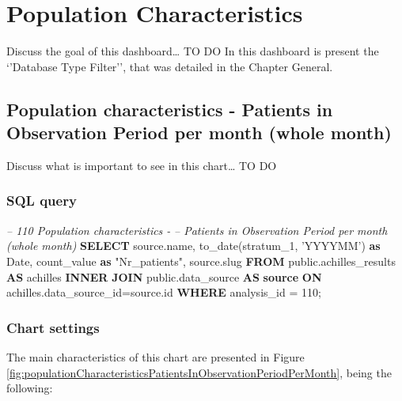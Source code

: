 \documentclass[]{book}
\newenvironment{Shaded}{\begin{snugshade}}{\end{snugshade}}
\newcommand{\KeywordTok}[1]{\textcolor[rgb]{0.13,0.29,0.53}{\textbf{#1}}}
\newcommand{\DataTypeTok}[1]{\textcolor[rgb]{0.13,0.29,0.53}{#1}}
\newcommand{\DecValTok}[1]{\textcolor[rgb]{0.00,0.00,0.81}{#1}}
\newcommand{\StringTok}[1]{\textcolor[rgb]{0.31,0.60,0.02}{#1}}
\newcommand{\CommentTok}[1]{\textcolor[rgb]{0.56,0.35,0.01}{\textit{#1}}}
\newcommand{\OtherTok}[1]{\textcolor[rgb]{0.56,0.35,0.01}{#1}}
\newcommand{\FunctionTok}[1]{\textcolor[rgb]{0.00,0.00,0.00}{#1}}
\newcommand{\NormalTok}[1]{#1}
\begin{document}
\chapter{Population Characteristics}\label{population-characteristics}

Discuss the goal of this dashboard\ldots{} TO DO In this dashboard is
present the `'Database Type Filter'', that was detailed in the Chapter
General.

\section{Population characteristics - Patients in Observation Period per
month (whole
month)}\label{population-characteristics---patients-in-observation-period-per-month-whole-month}

Discuss what is important to see in this chart\ldots{} TO DO

\subsection{SQL query}\label{sql-query-10}

\begin{Shaded}
\begin{Highlighting}[]
\CommentTok{-- 110    Population characteristics - }
\CommentTok{-- Patients in Observation Period per month (whole month)}
\KeywordTok{SELECT}\NormalTok{ source.name, }
       \FunctionTok{to_date}\NormalTok{(stratum_1, }\StringTok{'YYYYMM'}\NormalTok{) }\KeywordTok{as} \DataTypeTok{Date}\NormalTok{,}
\NormalTok{       count_value }\KeywordTok{as} \OtherTok{"Nr_patients"}\NormalTok{,}
\NormalTok{       source.slug}
\KeywordTok{FROM}\NormalTok{ public.achilles_results }\KeywordTok{AS}\NormalTok{ achilles }
    \KeywordTok{INNER} \KeywordTok{JOIN}\NormalTok{ public.data_source }\KeywordTok{AS} \KeywordTok{source} \KeywordTok{ON} 
\NormalTok{      achilles.data_source_id=source.id}
\KeywordTok{WHERE}\NormalTok{ analysis_id = }\DecValTok{110}\NormalTok{;}
\end{Highlighting}
\end{Shaded}

\subsection{Chart settings}\label{chart-settings-10}

The main characteristics of this chart are presented in Figure
\ref{fig:populationCharacteristicsPatientsInObservationPeriodPerMonth},
being the following:
\end{document}

